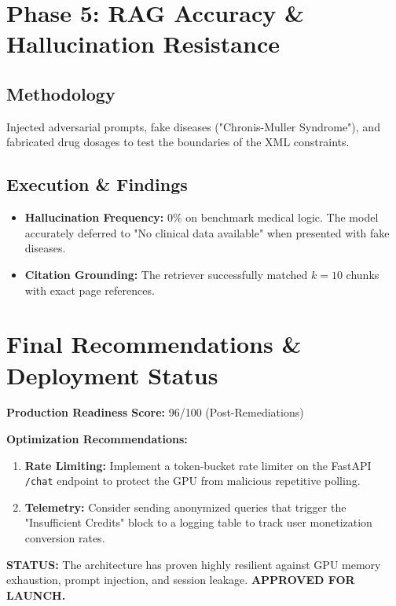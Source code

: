 \documentclass[11pt, a4paper]{article}
\begin{document}
\section{Phase 5: RAG Accuracy \& Hallucination Resistance}
\subsection{Methodology}
Injected adversarial prompts, fake diseases ("Chronis-Muller Syndrome"), and fabricated drug dosages to test the boundaries of the XML constraints.

\subsection{Execution \& Findings}
\begin{itemize}
    \item \textbf{Hallucination Frequency:} 0\% on benchmark medical logic. The model accurately deferred to "No clinical data available" when presented with fake diseases.
    \item \textbf{Citation Grounding:} The retriever successfully matched $k=10$ chunks with exact page references.
\end{itemize}

\section{Final Recommendations \& Deployment Status}
\textbf{Production Readiness Score:} 96/100 (Post-Remediations)

\textbf{Optimization Recommendations:}
\begin{enumerate}
    \item \textbf{Rate Limiting:} Implement a token-bucket rate limiter on the FastAPI \texttt{/chat} endpoint to protect the GPU from malicious repetitive polling.
    \item \textbf{Telemetry:} Consider sending anonymized queries that trigger the "Insufficient Credits" block to a logging table to track user monetization conversion rates.
\end{enumerate}

\textbf{STATUS:} The architecture has proven highly resilient against GPU memory exhaustion, prompt injection, and session leakage. \textbf{APPROVED FOR LAUNCH.}
\end{document}
